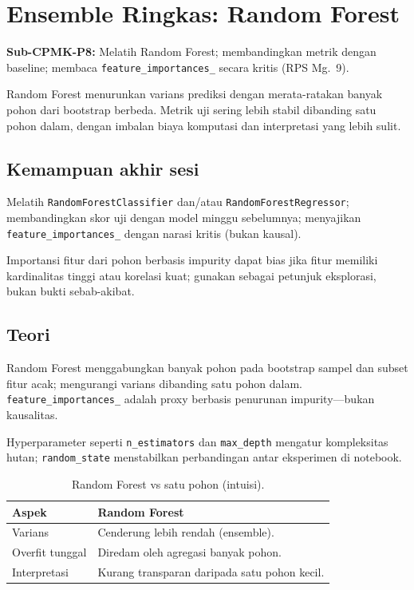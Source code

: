 \documentclass[../main.tex]{subfiles}
\begin{document}
\chapter{Ensemble Ringkas: Random Forest}

\begin{subcpmk}
  \item \textbf{Sub-CPMK-P8:} Melatih Random Forest; membandingkan metrik dengan baseline; membaca \texttt{feature\_importances\_} secara kritis (RPS Mg.\ 9).
\end{subcpmk}


\noindent Random Forest menurunkan varians prediksi dengan merata-ratakan banyak pohon dari bootstrap berbeda. Metrik uji sering lebih stabil dibanding satu pohon dalam, dengan imbalan biaya komputasi dan interpretasi yang lebih sulit.

\section{Kemampuan akhir sesi}

Melatih \texttt{RandomForestClassifier} dan/atau \texttt{RandomForestRegressor}; membandingkan skor uji dengan model minggu sebelumnya; menyajikan \texttt{feature\_importances\_} dengan narasi kritis (bukan kausal).

Importansi fitur dari pohon berbasis impurity dapat bias jika fitur memiliki kardinalitas tinggi atau korelasi kuat; gunakan sebagai petunjuk eksplorasi, bukan bukti sebab-akibat.

\section{Teori}

\begin{konsep}
Random Forest menggabungkan banyak pohon pada bootstrap sampel dan subset fitur acak; mengurangi varians dibanding satu pohon dalam. \texttt{feature\_importances\_} adalah proxy berbasis penurunan impurity---bukan kausalitas.
\end{konsep}

Hyperparameter seperti \texttt{n\_estimators} dan \texttt{max\_depth} mengatur kompleksitas hutan; \texttt{random\_state} menstabilkan perbandingan antar eksperimen di notebook.

\begin{table}[htbp]
\centering
\caption{Random Forest vs satu pohon (intuisi).}
\label{tab:rf-vs-tree}
\begin{tabular}{@{}p{3.8cm}p{8.9cm}@{}}
\toprule
\textbf{Aspek} & \textbf{Random Forest} \\
\midrule
Varians & Cenderung lebih rendah (ensemble). \\
Overfit tunggal & Diredam oleh agregasi banyak pohon. \\
Interpretasi & Kurang transparan daripada satu pohon kecil. \\
\bottomrule
\end{tabular}
\end{table}
\end{document}
